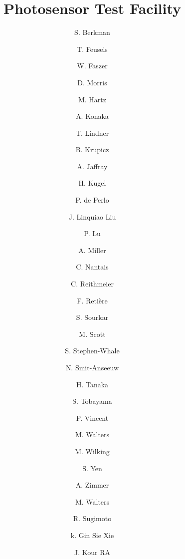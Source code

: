 \begin{frontmatter}


\title{Photosensor Test Facility}


\author[ins:ubc,ins:triu]{S. Berkman}
\author[ins:ubc,ins:triu]{T. Feusels}
\cortext[cor1]{}
\author[ins:triu]{W. Faszer}
\author[ins:triu]{D. Morris}
\author[ins:triu,ins:kav]{M. Hartz}
\author[ins:triu]{A. Konaka}
\author[ins:triu]{T. Lindner}
\author[]{B. Krupicz}
\author[]{A. Jaffray}
\author[]{H. Kugel}
\author[]{P. de Perlo}
\author[]{J. Linquiao Liu}
\author[]{P. Lu}
\author[]{A. Miller}
\author[]{C. Nantais}
\author[]{C. Reithmeier}
\author[]{F. Reti\`ere}
\author[]{S. Sourkar}
\author[]{M. Scott}
\author[]{S. Stephen-Whale}
\author[]{N. Smit-Anseeuw}
\author[]{H. Tanaka}
\author[]{S. Tobayama}
\author[]{P. Vincent}
\author[]{M. Walters}
\author[]{M. Wilking}
\author[]{S. Yen}
\author[]{A. Zimmer}
\author[]{M. Walters}
\author[]{R. Sugimoto}
\author[]{k. Gin Sie Xie}
\author[]{J. Kour RA}



\address[ins:ubc]{University of British Columbia, Department of Physics and Astronomy, Vancouver, British Columbia, Canada}
\address[ins:triu]{TRIUMF, Vancouver, British Columbia, Canada}
\address[ins:kav]{Kavli Institute for the Physics and Mathematics of the Universe (WPI), The University
of Tokyo Institutes for Advanced Study, University of Tokyo, Kashiwa, Chiba, Japan}






\end{frontmatter}
